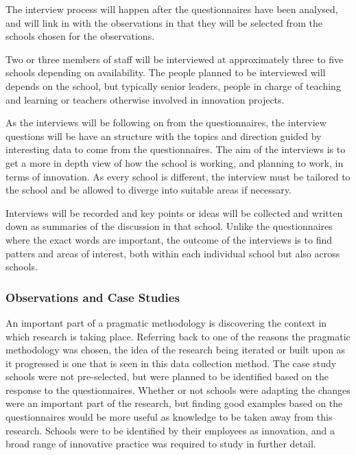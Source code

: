 \documentclass[11pt]{article}
\begin{document}
The interview process will happen after the questionnaires have been analysed, and will link in with the observations in that they will be selected from the schools chosen for the observations.

Two or three members of staff will be interviewed at approximately three to five schools depending on availability. The people planned to be interviewed will depends on the school, but typically senior leaders, people in charge of teaching and learning or teachers otherwise involved in innovation projects.

As the interviews will be following on from the questionnaires, the interview questions will be have an structure with the topics and direction guided by interesting data to come from the questionnaires. The aim of the interviews is to get a more in depth view of how the school is working, and planning to work, in terms of innovation. As every school is different, the interview must be tailored to the school and be allowed to diverge into suitable areas if necessary. 

Interviews will be recorded and key points or ideas will be collected and written down as summaries of the discussion in that school. Unlike the questionnaires where the exact words are important, the outcome of the interviews is to find patters and areas of interest, both within each individual school but also across schools.

\subsubsection{Observations and Case Studies}  An important part of a pragmatic methodology is discovering the context in which research is taking place. Referring back to one of the reasons the pragmatic methodology was chosen, the idea of the research being iterated or built upon as it progressed is one that is seen in this data collection method. The case study schools were not pre-selected, but were planned to be identified based on the response to the questionnaires. Whether or not schools were adapting the changes were an important part of the research, but finding good examples based on the questionnaires would be more useful as knowledge to be taken away from this research. Schools were to be identified by their employees as innovation, and a broad range of innovative practice was required to study in further detail. 
\end{document}
